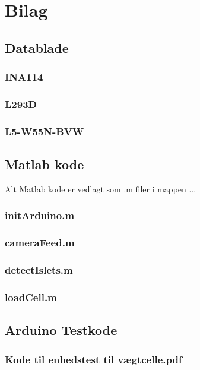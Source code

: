 \chapter{Bilag}
\section{Datablade}
\subsection{INA114}
\label{bilag:INA114}

\subsection{L293D}
\label{bilag:L293D}

\subsection{L5-W55N-BVW}
\label{bilag:L5-W55N-BVW}

\section{Matlab kode}
Alt Matlab kode er vedlagt som .m filer i mappen ... 
\subsection{initArduino.m} \label{bilag:initArduino}
\subsection{cameraFeed.m} \label{bilag:cameraFeed}
\subsection{detectIslets.m}
\subsection{loadCell.m}
\section{Arduino Testkode}

\subsection{Kode til enhedstest til vægtcelle.pdf} 
\label{bilag:TKloadcell}


